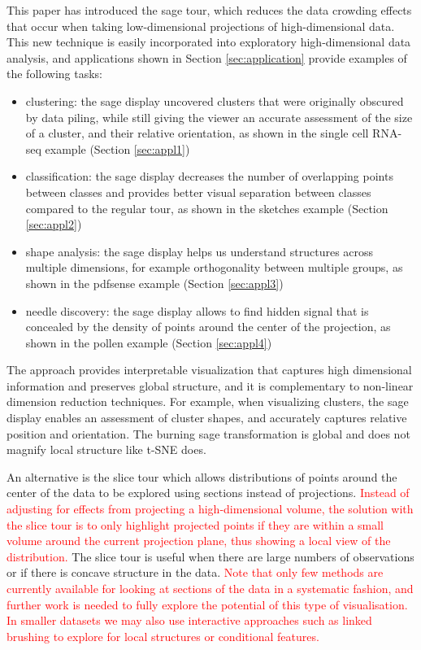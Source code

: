 \documentclass[]{interact}
\theoremstyle{plain}%
\theoremstyle{definition}
\theoremstyle{remark}
\def\tightlist{}
\begin{document}
This paper has introduced the sage tour, which reduces the data crowding
effects that occur when taking low-dimensional projections of
high-dimensional data. This new technique is easily incorporated into
exploratory high-dimensional data analysis, and applications shown in
Section \ref{sec:application} provide examples of the following tasks:

\begin{itemize}
\tightlist
\item
  clustering: the sage display uncovered clusters that were originally
  obscured by data piling, while still giving the viewer an accurate
  assessment of the size of a cluster, and their relative orientation,
  as shown in the single cell RNA-seq example (Section \ref{sec:appl1})
\item
  classification: the sage display decreases the number of overlapping
  points between classes and provides better visual separation between
  classes compared to the regular tour, as shown in the sketches example
  (Section \ref{sec:appl2})
\item
  shape analysis: the sage display helps us understand structures across
  multiple dimensions, for example orthogonality between multiple
  groups, as shown in the pdfsense example (Section \ref{sec:appl3})
\item
  needle discovery: the sage display allows to find hidden signal that
  is concealed by the density of points around the center of the
  projection, as shown in the pollen example (Section \ref{sec:appl4})
\end{itemize}

The approach provides interpretable visualization that captures high
dimensional information and preserves global structure, and it is
complementary to non-linear dimension reduction techniques. For example,
when visualizing clusters, the sage display enables an assessment of
cluster shapes, and accurately captures relative position and
orientation. The burning sage transformation is global and does not
magnify local structure like t-SNE does.

An alternative is the slice tour \citep{sliceTour} which allows
distributions of points around the center of the data to be explored
using sections instead of projections.
\textcolor{red}{Instead of adjusting for effects from projecting a high-dimensional volume, the solution with the slice tour is to only highlight projected points if they are within a small volume around the current projection plane, thus showing a local view of the distribution.}
The slice tour is useful when there are large numbers of observations or
if there is concave structure in the data.
\textcolor{red}{Note that only few methods are currently available for looking at sections of the data in a systematic fashion, and further work is needed to fully explore the potential of this type of visualisation. In smaller datasets we may also use interactive approaches such as linked brushing to explore for local structures or conditional features.}
\end{document}
